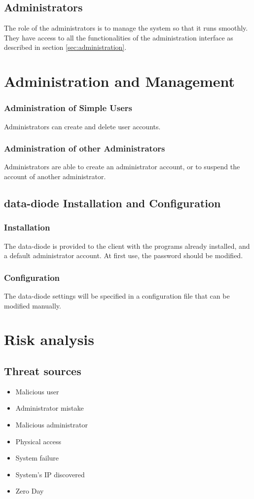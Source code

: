 \documentclass[a4paper,11pt]{article}
\begin{document}
\subsection{Administrators}
The role of the administrators is to manage the system so that it runs smoothly. They have access to all the functionalities of the administration interface as described in section \ref{sec:administration}.

\section{Administration and Management}

\subsubsection{Administration of Simple Users}
Administrators can create and delete user accounts.

\subsubsection{Administration of other Administrators}
Administrators are able to create an administrator account, or to suspend the account of another administrator.

\subsection{data-diode Installation and Configuration}

\subsubsection{Installation}
The data-diode is provided to the client with the programs already installed, and a default administrator account. At first use, the password should be modified.

\subsubsection{Configuration}
The data-diode settings will be specified in a configuration file that can be modified manually.

\section{Risk analysis}
\subsection{Threat sources}
\begin{itemize}
\item Malicious user
\item Administrator mistake
\item Malicious administrator
\item Physical access
\item System failure
\item System's IP discovered
\item Zero Day
\end{itemize}
\end{document}
